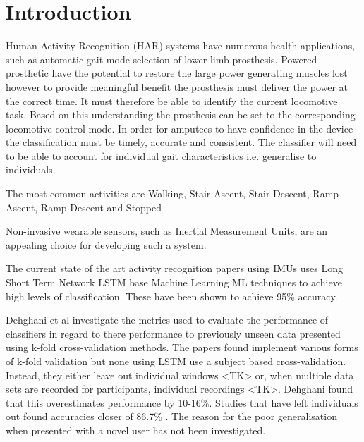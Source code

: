 \documentclass[sensors,article,submit,moreauthors,pdftex]{Definitions/mdpi}
\begin{document}

\section{Introduction}
Human Activity Recognition (HAR) systems have numerous health applications, such as automatic gait mode selection of lower limb prosthesis. Powered prosthetic have the potential to restore the large power generating muscles lost\cite{Ingraham2018} however to provide meaningful benefit the prosthesis must deliver the power at the correct time. It must therefore be able to identify the current locomotive task\cite{Grimes1983}. Based on this understanding the prosthesis can be set to the corresponding locomotive control mode\cite{Tucker2015, Windrich2016, Zhang2015}. In order for amputees to have confidence in the device the classification must be timely, accurate and consistent\cite{Pedroli2019, Sinha2011}. The classifier will need to be able to account for individual gait characteristics i.e. generalise to individuals\cite{Ponce2016}.

The most common activities are Walking, Stair Ascent, Stair Descent, Ramp Ascent, Ramp Descent and Stopped

Non-invasive wearable sensors, such as Inertial Measurement Units, are an appealing choice for developing such a system. 

The current state of the art activity recognition papers using IMUs uses Long Short Term Network LSTM base Machine Learning ML techniques to achieve high levels of classification. These have been shown to achieve 95\%\cite{Murad2017} accuracy.

Dehghani et al investigate the metrics used to evaluate the performance of classifiers in regard to there performance to previously unseen data presented using k-fold cross-validation methods\cite{Dehghani2019}. The papers found implement various forms of k-fold validation but none using LSTM use a subject based cross-validation. Instead, they either leave out individual windows \cite{Murad2017, Wang2020}<TK> or, when multiple data sets are recorded for participants, individual recordings \cite{Ordonez2016}<TK>. Dehghani found that this overestimates performance by 10-16\%. Studies that have left individuals out found accuracies closer of 86.7\% \cite{Zhao2018}. The reason for the poor generalisation when presented with a novel user has not been investigated.
\end{document}
